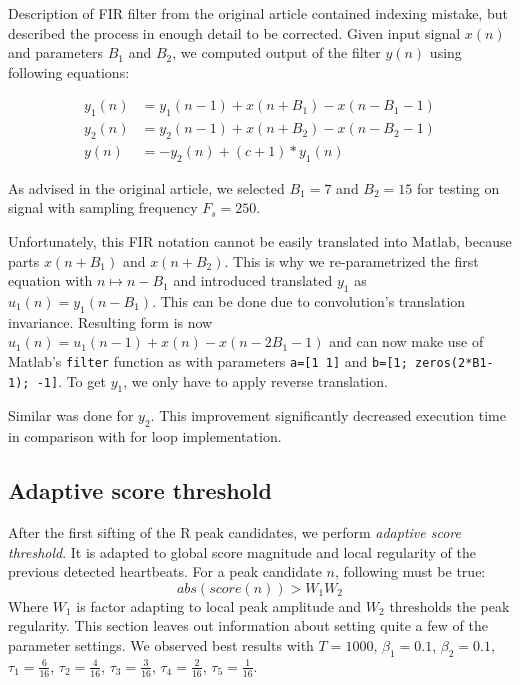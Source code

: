 \documentclass[fleqn,moreauthors,10pt]{ds_report}
\begin{document}
Description of FIR filter from the original article contained indexing mistake, but described the process in enough detail to be corrected. Given input signal $x(n)$ and parameters $B_1$ and $B_2$, we computed output of the filter $y(n)$ using following equations:

\begin{equation}
	\begin{aligned}
		y_1(n) & = y_1(n-1) + x(n+B_1) - x(n-B_1-1) \\
		y_2(n) & = y_2(n-1) + x(n+B_2) - x(n-B_2-1) \\
		y(n) & = -y_2(n) + (c+1)*y_1(n)
	\end{aligned}
\end{equation}

As advised in the original article, we selected $B_1 = 7$ and $B_2 = 15$ for testing on signal with sampling frequency $F_s = 250$.

Unfortunately, this FIR notation cannot be easily translated into Matlab, because parts $x(n+B_1)$ and $x(n+B_2)$. This is why we re-parametrized the first equation with $n \mapsto n - B_1$ and introduced translated $y_1$ as $u_1(n) = y_1(n - B_1)$. This can be done due to convolution's translation invariance. Resulting form is now $u_1(n) = u_1(n-1) + x(n) - x(n-2B_1-1)$ and 
can now make use of Matlab's \texttt{filter} function as with parameters \texttt{a=[1 1]} and \texttt{b=[1; zeros(2*B1-1); -1]}. To get $y_1$, we only have to apply reverse translation.

Similar was done for $y_2$. This improvement significantly decreased execution time in comparison with for loop implementation.

\subsection*{Adaptive score threshold}

After the first sifting of the R peak candidates, we perform \textit{adaptive score threshold}. It is adapted to global score magnitude and local regularity of the previous detected heartbeats. For a peak candidate $n$, following must be true: 
\begin{equation}
	abs(score(n)) > W_1 W_2
\end{equation}
Where $W_1$ is factor adapting to local peak amplitude and $W_2$ thresholds the peak regularity. This section leaves out information about setting quite a few of the parameter settings. We observed best results with $T = 1000$, $\beta_1 = 0.1$, $\beta_2 = 0.1$, $\tau_1 = \frac{6}{16}$, $\tau_2 = \frac{4}{16}$, $\tau_3 = \frac{3}{16}$, $\tau_4 = \frac{2}{16}$, $\tau_5 = \frac{1}{16}$.
\end{document}

